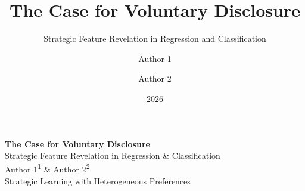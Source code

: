 \documentclass[aspectratio=169, 10pt]{beamer}
\title{The Case for Voluntary Disclosure}
\subtitle{Strategic Feature Revelation in Regression and Classification}
\author{Author 1 \and Author 2}
\date{2026}
\begin{document}
{
\begin{frame}
  \vfill
  \begin{center}
    {\Huge\color{white}\textbf{The Case for Voluntary Disclosure}}\\[12pt]
    {\Large\color{accentCoral}Strategic Feature Revelation in Regression \& Classification}\\[20pt]
    {\color{white!70}Author 1\textsuperscript{1} \quad \& \quad Author 2\textsuperscript{2}}\\[6pt]
    {\small\color{accentGold}Strategic Learning with Heterogeneous Preferences}
  \end{center}
  \vfill
\end{frame}
}
\end{document}
